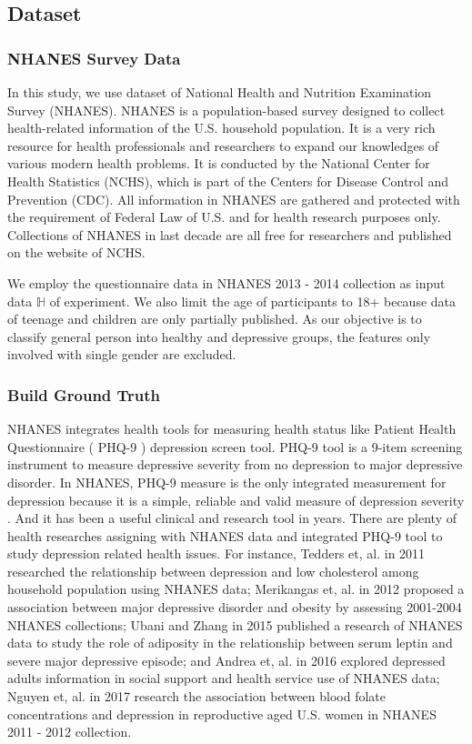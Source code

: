 \documentclass[10pt,journal,compsoc]{IEEEtran}
\begin{document}
\subsection{Dataset}
\subsubsection{NHANES Survey Data}
In this study, we use dataset of National Health and Nutrition Examination Survey (NHANES). NHANES is a population-based survey designed to collect health-related information of the U.S. household population. It is a very rich resource for health professionals and researchers to expand our knowledges of various modern health problems. It is conducted by the National Center for Health Statistics (NCHS), which is part of the Centers for Disease Control and Prevention (CDC). All information in NHANES are gathered and protected with the requirement of Federal Law of U.S. and for health research purposes only. Collections of NHANES in last decade are all free for researchers and published on the website of NCHS.

We employ the questionnaire data in NHANES 2013 - 2014 collection as input data $\mathbb{H}$ of experiment. We also limit the age of participants to 18+ because data of teenage and children are only partially published. As our objective is to classify general person into healthy and depressive groups, the features only involved with single gender are excluded.  
%
%
\subsubsection{Build Ground Truth}
NHANES integrates health tools for measuring health status like Patient Health Questionnaire ( PHQ-9 ) depression screen tool. PHQ-9 tool is a 9-item screening instrument to measure depressive severity from no depression to major depressive disorder. In NHANES, PHQ-9 measure is the only integrated measurement for depression because it is a simple, reliable and valid measure of depression severity \cite{Kroenke}. And it has been a useful clinical and research tool in years. There are plenty of health researches assigning with NHANES data and integrated PHQ-9 tool to study depression related health issues. For instance, Tedders et, al. \cite{Tedders} in 2011 researched the relationship between depression and low cholesterol among household population using NHANES data; Merikangas et, al. \cite{Merikangas} in 2012 proposed a association between major depressive disorder and obesity by assessing 2001-2004 NHANES collections; Ubani and Zhang \cite{Ubani} in 2015 published a research of NHANES data to study the role of adiposity in the relationship between serum leptin and severe major depressive episode; and Andrea et, al. \cite{Andrea} in 2016 explored depressed adults information in social support and health service use of NHANES data; Nguyen et, al. \cite{Nguyen} in 2017 research the association between blood folate concentrations and depression in reproductive aged U.S. women in NHANES 2011 - 2012 collection.
\end{document}
